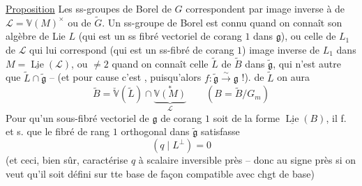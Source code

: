 \uline{Proposition} Les ss-groupes de Borel  de $G$ correspondent  par image inverse à   de $\mathcal L=\mathbb V(M)^\times$ ou  de $\widetilde G$. Un ss-groupe de Borel est connu quand on connaît son algèbre de Lie $L$ (qui est un ss fibré vectoriel de corang $1$ dans $\mathfrak g$), ou celle de $L_1$ de $\mathcal L$ qui lui correspond (qui est un ss-fibré   de corang $1$) image inverse de $L_1$ dans $M=\underline{\operatorname{Lie}}(\mathcal L)$,  ou  $\ne2$ quand on connaît celle $\widetilde L$ de $\widetilde B$ dans $\widetilde{\mathfrak g}$, qui n'est autre que $\widetilde L\cap\widetilde{\mathfrak g}$ -- (et pour cause c'est , puisqu'alors $f:\widetilde{\mathfrak g}\xrightarrow{\sim}\mathfrak g$ !).    de $\widetilde L$ on aura
\[
\widetilde B=\check{\mathbb V}(\widetilde L)\cap\underbrace{\mathbb V(M)}_{\mathcal L}^{*}\qquad(B=\widetilde B/G_m)\tag*{(57)}
\]
Pour qu'un sous-fibré vectoriel  de $\mathfrak g$ de corang $1$ soit de la forme $\underline{\operatorname{Lie}}(B)$, il f. et s. que le fibré   de rang $1$ orthogonal  dans $\widetilde{\mathfrak g}$ satisfasse
\[
(q\mid L^\perp)=0
\]
(et ceci, bien sûr, caractérise $q$  à scalaire inversible près  -- donc au signe près si on veut qu'il soit défini sur tte base de façon compatible avec chgt de base)

